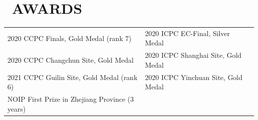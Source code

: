 \section{\faStar\ AWARDS}


\begin{tabular}{p{} p{}}
    2020 CCPC Finals, Gold Medal (rank 7)           & 2020 ICPC EC-Final, Silver Medal    \\
    2020 CCPC Changchun Site, Gold Medal            & 2020 ICPC Shanghai Site, Gold Medal \\
    2021 CCPC Guilin Site, Gold Medal (rank 6)      & 2020 ICPC Yinchuan Site, Gold Medal \\
    NOIP First Prize in Zhejiang Province (3 years) &                                     \\
\end{tabular}
